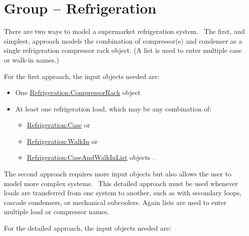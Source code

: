 \section{Group -- Refrigeration}\label{group-refrigeration}

There are two ways to model a supermarket refrigeration system.~ The first, and simplest, approach models the combination of compressor(s) and condenser as a single refrigeration compressor rack object. (A list is used to enter multiple case or walk-in names.)

For the first approach, the input objects needed are:

\begin{itemize}
  \item  One \hyperref[refrigerationcompressorrack]{Refrigeration:CompressorRack} object
  \item  At least one refrigeration load, which may be any combination of:
  \begin{itemize}
    \item  \hyperref[refrigerationcase]{Refrigeration:Case} or
    \item  \hyperref[refrigerationwalkin]{Refrigeration:WalkIn} or
    \item  \hyperref[refrigerationcaseandwalkinlist]{Refrigeration:CaseAndWalkInList} objects .
  \end{itemize}
\end{itemize}

The second approach requires more input objects but also allows the user to model more complex systems.~ This detailed approach must be used whenever loads are transferred from one system to another, such as with secondary loops, cascade condensers, or mechanical subcoolers. Again lists are used to enter multiple load or compressor names.

For the detailed approach, the input objects needed are:

